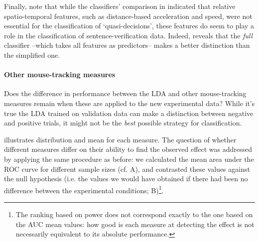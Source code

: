 \documentclass{article}
\begin{document}
Finally, note that while the classifiers' comparison in  indicated that relative spatio-temporal features, such as distance-based acceleration and speed, were not essential for the classification of `quasi-decisions', these features do seem to play a role in the classification of sentence-verification data. Indeed,  reveals that the \emph{full} classifier --which takes all features as predictors-- makes a better distinction than the simplified one.   

\paragraph{Other mouse-tracking measures}
Does the difference in performance between the LDA and other mouse-tracking measures remain when these are applied to the new experimental data?
While it's true the LDA trained on validation data can make a distinction between negative and positive trials, it might not be the \emph{best} possible strategy for classification. 

 illustrates distribution and mean for each measure.
The question of whether different measures differ on their ability to find the observed effect was addressed by applying the same procedure as before: we calculated the mean area under the ROC curve for different sample sizes (cf. A), and contrasted these values against the null hypothesis (i.e. the values we would have obtained if there had been no difference between the experimental conditions; B)\footnote{The ranking based on power does not correspond exactly to the one based on the AUC mean values: how good is each measure at detecting the effect is not necessarily equivalent to its absolute performance.}. 
\end{document}

